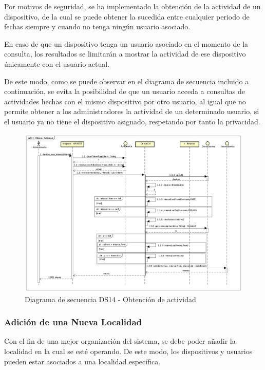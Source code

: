 Por motivos de seguridad, se ha implementado la obtención de la actividad de un dispositivo, de la cual se puede obtener la sucedida entre cualquier periodo de fechas siempre y cuando no tenga ningún usuario asociado.

En caso de que un dispositivo tenga un usuario asociado en el momento de la consulta, los resultados se limitarán a mostrar la actividad de ese dispositivo únicamente con el usuario actual.

De este modo, como se puede observar en el diagrama de secuencia incluido a continuación, se evita la posibilidad de que un usuario acceda a consultas de actividades hechas con el mismo dispositivo por otro usuario, al igual que no permite obtener a los administradores la actividad de un determinado usuario, si el usuario ya no tiene el dispositivo asignado, respetando por tanto la privacidad.

\begin{figure}[H]
    \centering
    \includegraphics[width=14cm]{./img/sequence/diagram/ObtenerActividad.png}
    \caption{Diagrama de secuencia DS14 - Obtención de actividad}
    \label{fig:seq.GetTask}
\end{figure}


\subsubsection{Adición de una Nueva Localidad}

Con el fin de una mejor organización del sistema, se debe poder añadir la localidad en la cual se esté operando. De este modo, los dispositivos y usuarios pueden estar asociados a una localidad específica.

